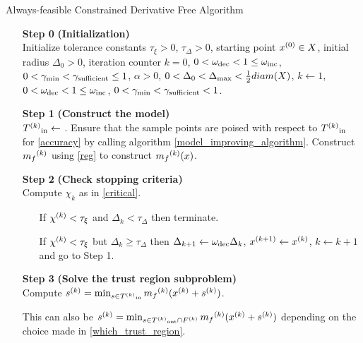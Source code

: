 \begin{algorithm}[H]
    \caption{Always-feasible Constrained Derivative Free Algorithm}
    \label{constrained_dfo}
    \begin{itemize}
        \item[\textbf{Step 0}] \textbf{(Initialization)} \\
            Initialize tolerance constants 
            $\tau_{\xi} > 0$,
            $\tau_{\Delta} > 0$,
            starting point $x^{(0)} \in X$,
            initial radius $\Delta_0 > 0$,
            iteration counter $k=0$,
            $0 < \omega_{\text{dec}} < 1 \le \omega_{\text{inc}}$,
            $0 < \gamma_{\text{min}} < \gamma_{\text{sufficient}} \le 1$,
            $\alpha > 0$,
            $0 < \Delta_0 < \Delta_{\text{max}} < \frac 1 2 diam(X)$,
            $k \gets 1$,
            $0 < \omega_{\text{dec}} < 1 \le \omega_{\text{inc}}$,
            $0 < \gamma_{\text{min}} < \gamma_{\text{sufficient}} < 1$.
            
        \item[\textbf{Step 1}] \textbf{(Construct the model)} \\
            ${T^{(k)}}_{\text{in}}\gets $ .
            Ensure that the sample points are poised with respect to ${T^{(k)}}_{\text{in}}$ for \cref{accuracy} by calling algorithm \cref{model_improving_algorithm}.
            Construct ${{m}_f}^{(k)}$ using \cref{reg} to construct ${{m}_f}^{(k)}(x)$.
        
        \item[\textbf{Step 2}] \textbf{(Check stopping criteria)} \\
            Compute $\chi_k$ as in \cref{critical}. \begin{itemize}
                \item[] If $ {\chi^{(k)}} < \tau_{\xi} $ and $\Delta_k<\tau_{\Delta}$ then terminate.
                \item[] If $ {\chi^{(k)}} < \tau_{\xi} $ but $\Delta_k\ge\tau_{\Delta}$ then 
                $\Delta_{k+1} \gets \omega_{\text{dec}}\Delta_{k}$, 
                $x^{(k+1)} \gets {x}^{(k)}$,
                $k \gets k+1$ and go to Step 1.
            \end{itemize}
        
        \item[\textbf{Step 3}] \textbf{(Solve the trust region subproblem)} \\
            Compute ${s}^{(k)} = \min_{s \in {T^{(k)}}_{\text{in}}} {{m}_f}^{(k)}({x}^{(k)} + {s}^{(k)})$.
            \item[] This can also be ${s}^{(k)} = \min_{s \in {T^{(k)}}_{\text{out}} \cap {F}^{(k)}} {{m}_f}^{(k)}({x}^{(k)} + {s}^{(k)})$ depending on the choice made in \cref{which_trust_region}.
            

\end{itemize}
\end{algorithm}
